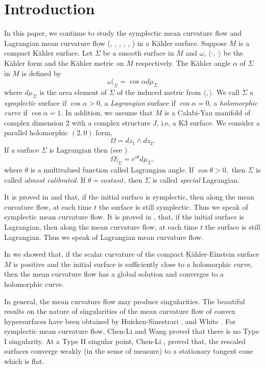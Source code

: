\section{Introduction}
In this paper, we continue to study the symplectic mean curvature
flow and Lagrangian mean curvature flow (\cite{CL1}, \cite{CL2},
\cite{CL3} \cite{HL1}, \cite{HL2}, \cite{Sm1}, \cite{Wa}) in a
K\"ahler surface. Suppose $M$ is a compact K\"ahler surface. Let
$\Sigma$ be a smooth surface in $M$ and $\omega$, $\langle\cdot,
\cdot\rangle$ be the K\"ahler form and the K\"ahler metric on $M$
respectively. The K\"ahler angle $\alpha$ of $\Sigma$ in $M$ is
defined by \cite{CW}
$$ \omega|_\Sigma=\cos\alpha d\mu_\Sigma
$$ where $d\mu_\Sigma$ is the area element of $\Sigma$ of the
induced metric from $\langle, \rangle$. We call $\Sigma$ a {\it
symplectic} surface if $\cos\alpha>0$, a {\it Lagrangian} surface
if $\cos\alpha=0$, a {\it holomorphic curve} if $\cos\alpha=1$. In
addition, we assume that $M$ is a Calabi-Yau manifold of complex
dimension $2$ with a complex structure $J$, i.e, a K3 surface. We
consider a parallel holomorphic $(2, 0)$ form,
$$ \Omega=dz_1\wedge dz_2. $$
If a surface $\Sigma$ is Lagrangian then (see \cite{HaL})
$$\Omega |_\Sigma=e^{i\theta}d\mu_\Sigma,
$$
where $\theta$ is a  multivalued function called Lagrangian angle.
If $ \cos\theta> 0, $ then $\Sigma$ is called {\it almost
calibrated}. If $\theta=costant$, then $\Sigma$ is called {\it
special} Lagrangian.

It is proved in \cite{CL1} and \cite{Wa} that, if the initial
surface is symplectic, then along the mean curvature flow, at each
time $t$ the surface is still symplectic. Thus we speak of
symplectic mean curvature flow. It is proved in \cite{Sm1},
\cite{Sm2} that, if the initial surface is Lagrangian, then along
the mean curvature flow, at each time $t$ the surface is still
Lagrangian. Thus we speak of Lagrangian mean curvature flow.

In \cite{HL1} we showed that, if the scalar curvature of the
compact K\"ahler-Einstein surface $M$ is positive and the initial
surface is sufficiently close to a holomorphic curve, then the
mean curvature flow has a global solution and converges to a
holomorphic curve.

In general, the mean curvature flow may produce singularities. The
beautiful results on the nature of singularities of the mean
curvature flow of convex hypersurfaces have been obtained by
Huisken-Sinestrari \cite{HS1}, \cite{HS2} and White \cite{W}. For
symplectic mean curvature flow, Chen-Li \cite{CL1} and Wang
\cite{Wa} proved that there is no Type I singularity. At a Type II
singular point, Chen-Li \cite{CL2}, \cite{CL3} proved that, the
rescaled surfaces converge weakly (in the sense of measure) to a
stationary tangent cone which is flat.

